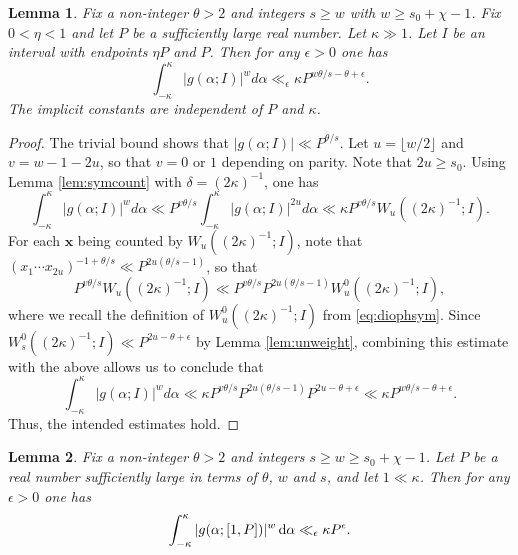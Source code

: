 \documentclass[11pt,reqno]{amsart}
\numberwithin{equation}{section}
\newtheorem{lemma}{Lemma}[section]
\renewcommand{\d}{\,{\rm d}}
\begin{document}
\begin{lemma} \label{lem:approxweightmean}
Fix a non-integer $\theta > 2$ and integers $s \geq w$ with $w \geq s_0+\chi-1$. Fix $0 < \eta < 1$ and let $P$ be a sufficiently large real number. Let $\kappa \gg 1$. Let $I$ be an interval with endpoints $\eta P$ and $P$. Then for any $\epsilon > 0$ one has 
\[ \int_{-\kappa}^{\kappa} |g(\alpha;I)|^{w}d\alpha \ll_{\epsilon} \kappa P^{w\theta/s-\theta+\epsilon}. \]
The implicit constants are independent of $P$ and $\kappa$. 
\end{lemma}

\begin{proof} The trivial bound shows that $|g(\alpha;I)| \ll P^{\theta/s}$. Let $u = \lfloor w/2 \rfloor $ and $v = w-1-2u$, so that $v = 0$ or $1$ depending on parity. Note that $2u \geq s_0$.  
Using Lemma \ref{lem:symcount} with $\delta = (2\kappa)^{-1}$, one has 
\[ \int_{-\kappa}^{\kappa} |g(\alpha;I)|^{w}d\alpha \ll P^{v\theta/s}\int_{-\kappa}^{\kappa} |g(\alpha;I)|^{2u}d\alpha \ll \kappa P^{v\theta/s} W_u((2\kappa)^{-1};I). \]
For each $\mathbf{x}$ being counted by $W_u((2\kappa)^{-1};I)$, note that $(x_1\cdots x_{2u})^{-1+\theta/s} \ll P^{2u(\theta/s-1)}$, 
so that 
\[ P^{v\theta/s} W_u((2\kappa)^{-1};I) \ll P^{v\theta/s} P^{2u(\theta/s-1)}W^0_u((2\kappa)^{-1};I), \]
where we recall the definition of $W^0_u((2\kappa)^{-1};I)$ from \eqref{eq:diophsym}.
Since $W^0_s((2\kappa)^{-1};I) \ll P^{2u-\theta+\epsilon}$ by Lemma \ref{lem:unweight}, combining this estimate with the above allows us to conclude that 
\[ \int_{-\kappa}^{\kappa} |g(\alpha;I)|^{w}d\alpha \ll \kappa  P^{v\theta/s}P^{2u(\theta/s-1)}P^{2u-\theta+\epsilon} \ll \kappa  P^{w\theta/s-\theta+\epsilon}. \]
Thus, the intended estimates hold. 
\end{proof} 

\begin{lemma} \label{lem:approxfullrange}
Fix a non-integer $\theta > 2$ and integers $s \geq w \geq s_0+\chi-1$. Let $P $ be a real number sufficiently large in terms of $\theta$, $w$ and $s$, and let $1 \ll \kappa$. Then for any $\epsilon > 0$ one has 
\[ \int_{-\kappa}^{\kappa} |g(\alpha;[1,P])|^w\d\alpha \ll_{\epsilon} \kappa P^{\epsilon}. \]
\end{lemma}
\end{document}
